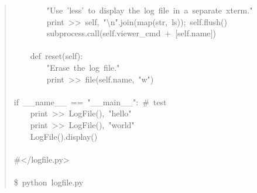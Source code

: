 \documentclass[10pt,a4paper,english]{article}
\begin{document}
\begin{quote}
{~~~~~~~~"Use~'less'~to~display~the~log~file~in~a~separate~xterm."~\\
~~~~~~~~print~>{}>~self,~"{\textbackslash}n".join(map(str,~ls));~self.flush()~\\
~~~~~~~~subprocess.call(self.viewer{\_}cmd~+~{[}self.name])~\\
~\\
~~~~def~reset(self):~\\
~~~~~~~~"Erase~the~log~file."~\\
~~~~~~~~print~>{}>~file(self.name,~"w")~\\
~\\
if~{\_}{\_}name{\_}{\_}~==~"{\_}{\_}main{\_}{\_}":~{\#}~test~\\
~~~~print~>{}>~LogFile(),~"hello"~\\
~~~~print~>{}>~LogFile(),~"world"~\\
~~~~LogFile().display()~\\
~\\
{\#}</logfile.py>~\\
~\\
{\$}~python~logfile.py
}\end{quote}



\hypertarget{cooperative-hierarchies}{}
\end{document}
